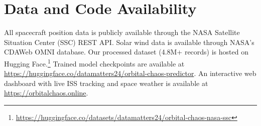 \documentclass[twocolumn]{article}
\begin{document}
\section*{Data and Code Availability}

All spacecraft position data is publicly available through the NASA
Satellite Situation Center (SSC) REST API. Solar wind data is available
through NASA's CDAWeb OMNI database. Our processed dataset (4.8M+
records) is hosted on Hugging
Face.\footnote{\url{https://huggingface.co/datasets/datamatters24/orbital-chaos-nasa-ssc}}
Trained model checkpoints are available at
\url{https://huggingface.co/datamatters24/orbital-chaos-predictor}.
An interactive web dashboard with live ISS tracking and space weather
is available at \url{https://orbitalchaos.online}.



\end{document}
